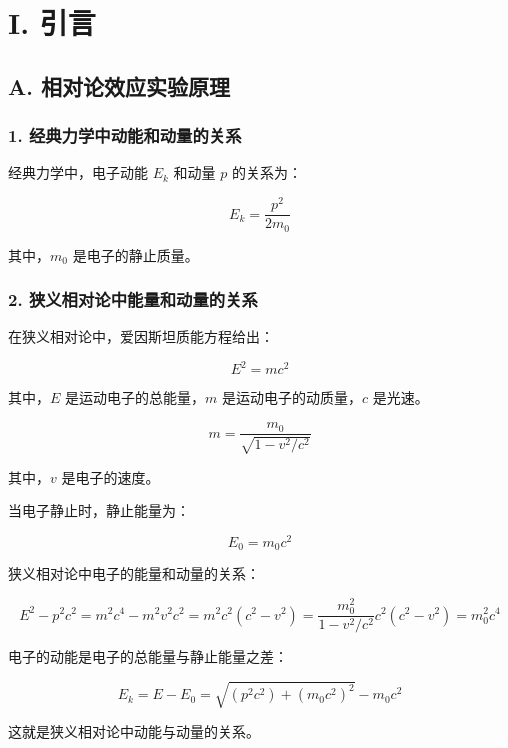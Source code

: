 \documentclass[aps,prl,preprint,groupedaddress]{revtex4-2}
\begin{document}
\section{I. 引言}
\subsection{A. 相对论效应实验原理}

\subsubsection{1. 经典力学中动能和动量的关系}

经典力学中，电子动能 $E_k$ 和动量 $p$ 的关系为：

$$
E_k = \frac{p^2}{2m_0}
$$

其中，$m_0$ 是电子的静止质量。

\subsubsection{2. 狭义相对论中能量和动量的关系}

在狭义相对论中，爱因斯坦质能方程给出：

$$
E^2 = m c^2
$$

其中，$E$ 是运动电子的总能量，$m $ 是运动电子的动质量，$c $ 是光速。

$$
m = \frac{m_0}{\sqrt{1-v^2/c^2}}
$$

其中，$v$ 是电子的速度。

当电子静止时，静止能量为：

$$
E_0 = m_0 c^2
$$

狭义相对论中电子的能量和动量的关系：

$$
E^2-p^2c^2
=m^2 c^4-m^2v^2c^2
=m^2c^2(c^2-v^2)
=\frac{m_0^2}{1-v^2/c^2}c^2(c^2-v^2)
=m_0^2c^4
$$

电子的动能是电子的总能量与静止能量之差：

$$
E_k
=E-E_0
=\sqrt{(p^2c^2)+\left(m_0c^2\right)^2} - m_0c^2
$$

这就是狭义相对论中动能与动量的关系。
\end{document}
